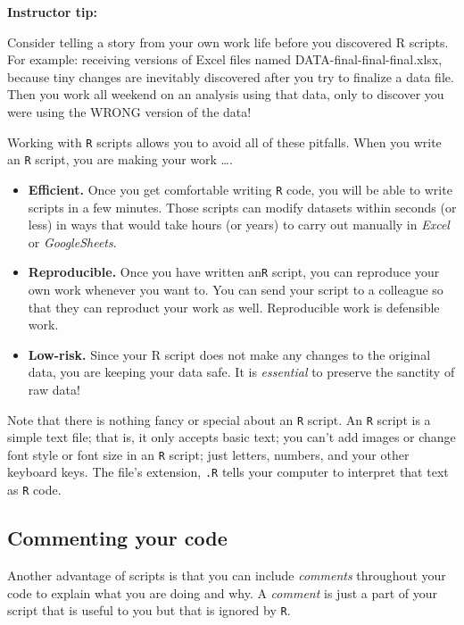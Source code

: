 \documentclass[]{book}
\begin{document}
\leavevmode\hypertarget{tip-text}{}%
\textbf{Instructor tip:}

Consider telling a story from your own work life before you discovered R scripts. For example: receiving versions of Excel files named DATA-final-final-final.xlsx, because tiny changes are inevitably discovered after you try to finalize a data file. Then you work all weekend on an analysis using that data, only to discover you were using the WRONG version of the data!

Working with \texttt{R} scripts allows you to avoid all of these pitfalls. When you write an \texttt{R} script, you are making your work \ldots{}.

\begin{itemize}
\item
  \textbf{Efficient.} Once you get comfortable writing \texttt{R} code, you will be able to write scripts in a few minutes. Those scripts can modify datasets within seconds (or less) in ways that would take hours (or years) to carry out manually in \emph{Excel} or \emph{GoogleSheets}.
\item
  \textbf{Reproducible.} Once you have written an\texttt{R} script, you can reproduce your own work whenever you want to. You can send your script to a colleague so that they can reproduct your work as well. Reproducible work is defensible work.
\item
  \textbf{Low-risk.} Since your R script does not make any changes to the original data, you are keeping your data safe. It is \emph{essential} to preserve the sanctity of raw data!
\end{itemize}

Note that there is nothing fancy or special about an \texttt{R} script. An \texttt{R} script is a simple text file; that is, it only accepts basic text; you can't add images or change font style or font size in an \texttt{R} script; just letters, numbers, and your other keyboard keys. The file's extension, \texttt{.R} tells your computer to interpret that text as \texttt{R} code.

\hypertarget{commenting-your-code}{%
\subsection*{Commenting your code}\label{commenting-your-code}}

Another advantage of scripts is that you can include \emph{comments} throughout your code to explain what you are doing and why. A \emph{comment} is just a part of your script that is useful to you but that is ignored by \texttt{R}.
\end{document}
